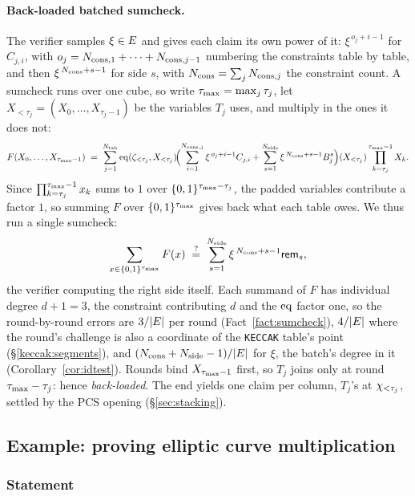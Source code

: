 \paragraph{Back-loaded batched sumcheck.} The verifier samples $\xi\in E$ and gives each claim its own power of it: $\xi^{\,o_j+i-1}$ for $C_{j,i}$, with $o_j=N_{\mathrm{cons},1}+\dots+N_{\mathrm{cons},j-1}$ numbering the constraints table by table, and then $\xi^{\,N_{\mathrm{cons}}+s-1}$ for side $s$, with $N_{\mathrm{cons}}=\sum_jN_{\mathrm{cons},j}$ the constraint count. A sumcheck runs over one cube, so write $\tau_{\max}=\max_j\tau_j$, let $X_{<\tau_j}=(X_0,\dots,X_{\tau_j-1})$ be the variables $T_j$ uses, and multiply in the ones it does not:
\[
  F(X_0,\dots,X_{\tau_{\max}-1})\;=\;\sum_{j=1}^{N_{\mathrm{tab}}}\operatorname{eq}(\zeta_{<\tau_j},X_{<\tau_j})\!
  \Bigl(\sum_{i=1}^{N_{\mathrm{cons},j}}\xi^{\,o_j+i-1}C_{j,i}+\sum_{s=1}^{N_{\mathrm{side}}}\xi^{\,N_{\mathrm{cons}}+s-1}B^{s}_j\Bigr)(X_{<\tau_j})
  \prod_{k=\tau_j}^{\tau_{\max}-1}X_k .
\]
Since $\prod_{k=\tau_j}^{\tau_{\max}-1}x_k$ sums to $1$ over $\{0,1\}^{\tau_{\max}-\tau_j}$, the padded variables contribute a factor $1$, so summing $F$ over $\{0,1\}^{\tau_{\max}}$ gives back what each table owes. We thus run a single sumcheck:
\[
  \sum_{x\in\{0,1\}^{\tau_{\max}}}F(x)\;\stackrel{?}{=}\;\sum_{s=1}^{N_{\mathrm{side}}}\xi^{\,N_{\mathrm{cons}}+s-1}\mathsf{rem}_{s},
\]
the verifier computing the right side itself. Each summand of $F$ has individual degree $d+1=3$, the constraint contributing $d$ and the $\operatorname{eq}$ factor one, so the round-by-round errors are $3/|E|$ per round (Fact~\ref{fact:sumcheck}), $4/|E|$ where the round's challenge is also a coordinate of the \texttt{KECCAK} table's point (\S\ref{keccak:segments}), and $(N_{\mathrm{cons}}+N_{\mathrm{side}}-1)/|E|$ for $\xi$, the batch's degree in it (Corollary~\ref{cor:idtest}). Rounds bind $X_{\tau_{\max}-1}$ first, so $T_j$ joins only at round $\tau_{\max}-\tau_j$: hence \emph{back-loaded}. The end yields one claim per column, $T_j$'s at $\chi_{<\tau_j}$, settled by the PCS opening (\S\ref{sec:stacking}).

\subsection{Example: proving elliptic curve multiplication}\label{sec:arith-example}

\subsubsection{Statement}

